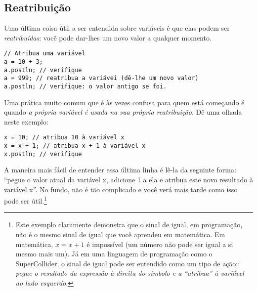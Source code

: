 \subsection{Reatribuição}

Uma última coisa útil a ser entendida sobre variáveis é que elas podem ser \emph{reatribuídas}: você pode dar-lhes um novo valor a qualquer momento.

\begin{lstlisting}[style=SuperCollider-IDE, basicstyle=\scttfamily\footnotesize]
// Atribua uma variável
a = 10 + 3;
a.postln; // verifique
a = 999; // reatribua a variávei (dê-lhe um novo valor)
a.postln; // verifique: o valor antigo se foi.
\end{lstlisting}

Uma prática muito comum que é às vezes confusa para quem está começando é quando \emph{a própria variável é usada na sua própria reatribuição}. Dê uma olhada neste exemplo:

\begin{lstlisting}[style=SuperCollider-IDE, basicstyle=\scttfamily\footnotesize]
x = 10; // atribua 10 à variável x
x = x + 1; // atribua x + 1 à variável x
x.postln; // verifique
\end{lstlisting}

A maneira mais fácil de entender essa última linha é lê-la da seguinte forma: “pegue o valor atual da variável x, adicione 1 a ela e atribua este novo resultado à variável x”. No fundo, não é tão complicado e você verá mais tarde como isso pode ser útil.\footnote{Este exemplo claramente demonstra que o sinal de igual, em programação, não é o mesmo sinal de igual que você aprendeu em matemática. Em matemática, $x = x + 1$ é impossível (um número não pode ser igual a si mesmo mais um). Já em uma linguagem de programação como o SuperCollider, o sinal de igual pode ser entendido como um tipo de ação:: \emph{pegue o resultado da expressão à direita do símbolo e a “atribua” à variável ao lado esquerdo}.}

